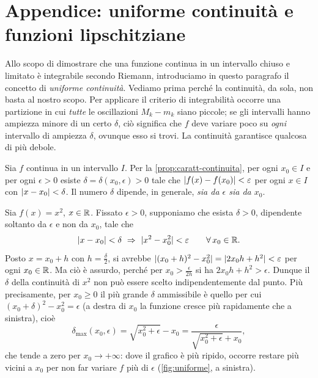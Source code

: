\section{Appendice: uniforme continuità e funzioni lipschitziane}
\label{sec:uniforme-continuita}

Allo scopo di dimostrare che una funzione continua in un intervallo chiuso e limitato è
integrabile secondo Riemann, introduciamo in questo paragrafo il concetto di
\emph{uniforme continuità}. Vediamo prima perché la continuità, da sola, non basta al
nostro scopo. Per applicare il criterio di integrabilità occorre una partizione in cui
\emph{tutte} le oscillazioni $M_{k}-m_{k}$ siano piccole; se gli intervalli hanno
ampiezza minore di un certo $\delta$, ciò significa che $f$ deve variare poco su
\emph{ogni} intervallo di ampiezza $\delta$, ovunque esso si trovi. La continuità
garantisce qualcosa di più debole.

Sia $f$ continua in un intervallo $I$. Per la \cref{prop:caratt-continuita}, per ogni
$x_{0}\in I$ e per ogni $\epsilon>0$ esiste $\delta=\delta(x_{0},\epsilon)>0$ tale che
$\lvert f(x)-f(x_{0})\rvert<\varepsilon$ per ogni $x\in I$ con $\lvert x-x_{0}\rvert<\delta$. Il numero
$\delta$ dipende, in generale, \emph{sia da $\epsilon$ sia da $x_{0}$}.

\begin{esempio}[La funzione $x^{2}$ su $\R$]\label{es:x2-non-uniforme}
Sia $f(x)=x^{2}$, $x\in\mathbb{R}$. Fissato $\epsilon>0$, supponiamo che esista $\delta>0$,
dipendente soltanto da $\epsilon$ e non da $x_{0}$, tale che
\begin{equation}\label{eq:x2-uniforme-ipotesi}
  \lvert x-x_{0}\rvert<\delta \ \Rightarrow\ \lvert x^{2}-x_{0}^{2}\rvert<\varepsilon \qquad\forall\, x_{0}\in\mathbb{R} .
\end{equation}
Posto $x=x_{0}+h$ con $h=\frac\delta2$, si avrebbe
$\lvert (x_{0}+h)^{2}-x_{0}^{2}\rvert=\lvert 2x_{0}h+h^{2}\rvert<\varepsilon$ per ogni $x_{0}\in\mathbb{R}$. Ma ciò è
assurdo, perché per $x_{0}>\frac\epsilon{2h}$ si ha $2x_{0}h+h^{2}>\epsilon$. Dunque il
$\delta$ della continuità di $x^{2}$ non può essere scelto indipendentemente dal punto.
Più precisamente, per $x_{0}\ge0$ il più grande $\delta$ ammissibile è quello per cui
$(x_{0}+\delta)^{2}-x_{0}^{2}=\epsilon$ (a destra di $x_{0}$ la funzione cresce più
rapidamente che a sinistra), cioè
\begin{equation}\label{eq:delta-x2}
  \delta_{\max}(x_{0},\epsilon)=\sqrt{x_{0}^{2}+\epsilon}-x_{0}
  =\frac{\epsilon}{\sqrt{x_{0}^{2}+\epsilon}+x_{0}} ,
\end{equation}
che tende a zero per $x_{0}\to+\infty$: dove il grafico è più ripido, occorre restare più
vicini a $x_{0}$ per non far variare $f$ più di $\epsilon$ (\cref{fig:uniforme}, a
sinistra).
\end{esempio}

